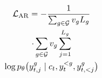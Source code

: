 \documentclass[border=7pt,varwidth=108mm]{standalone}
\begin{document}
\color{ink}\fontsize{15}{23}\selectfont
\[
\begin{gathered} \mathcal L_{\rm AR}=-\frac{1}{\sum_{g\in\mathcal G}v_gL_g}\\ \cdot\sum_{g\in\mathcal G}v_g\sum_{j=1}^{L_g}\\ \log p_\theta\!\left(y^g_{t,j}\mid c_t,y_t^{<g},y^g_{t,<j}\right)\end{gathered}
\]
\end{document}
